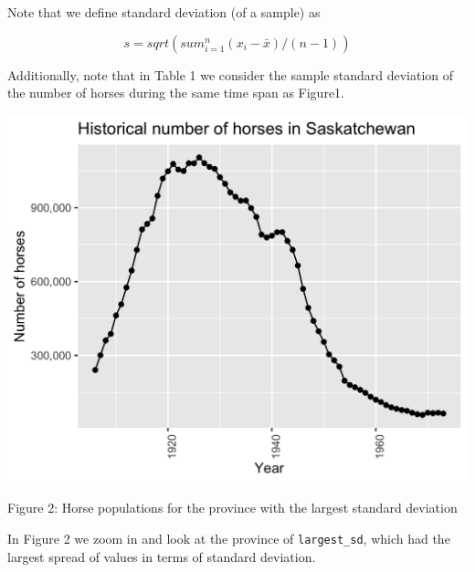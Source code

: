 \documentclass[
]{jss}
\begin{document}
Note that we define standard deviation (of a sample) as

\[s = sqrt( sum_{i = 1}^n(x_i - \bar{x}) / (n-1))\]

Additionally, note that in Table 1 we consider the sample standard deviation of the number of horses during the same time span as Figure1.

\begin{CodeChunk}


\begin{center}\includegraphics[width=0.5\linewidth]{../../results/horse_pop_plot_largest_sd} \end{center}

\end{CodeChunk}

Figure 2: Horse populations for the province with the largest standard deviation

In Figure 2 we zoom in and look at the province of \texttt{largest\_sd}, which had the largest spread of values in terms of standard deviation.

\renewcommand\refname{References}

\end{document}
